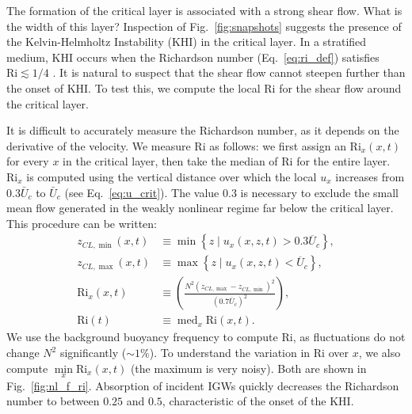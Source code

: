 \documentclass[
        fleqn,
        usenatbib,
    ]{mnras}
\newcommand*{\p}[1]{\left(#1\right)}
\newcommand*{\z}[1]{\left\{#1\right\}}
\DeclareMathOperator*{\med}{med}
\begin{document}
The formation of the critical layer is associated with a strong shear flow. What
is the width of this layer? Inspection of Fig.~\ref{fig:snapshots} suggests the
\textcolor{Corr}{presence} of the Kelvin-Helmholtz Instability (KHI) in the
critical layer. In a stratified medium, KHI occurs when the Richardson number
(Eq.~\eqref{eq:ri_def}) satisfies $\mathrm{Ri} \lesssim 1/4$
\citep[e.g.][]{shu1991physics}. It is natural to suspect that the shear flow
cannot steepen further than the onset of KHI\@. To test this, we compute the
local $\mathrm{Ri}$ for the shear flow around the critical layer.

It is difficult to accurately measure the Richardson number, as it depends on
the derivative of the velocity. We measure $\mathrm{Ri}$ as follows: we first
assign an $\mathrm{Ri}_x(x, t)$ for every $x$ in the critical layer, then take
the median of $\mathrm{Ri}$ for the entire layer. $\mathrm{Ri}_x$ is computed
using the vertical distance over which the local $u_x$ increases from
$0.3\bar{U}_c$ to $\bar{U}_c$ (see Eq.~\eqref{eq:u_crit}). The value $0.3$ is
necessary to exclude the small mean flow generated in the weakly nonlinear
regime far below the
critical layer. This procedure can be written:
\begin{align}
    z_{CL, \min}(x, t) &\equiv \min
        \z{z\mid u_x(x, z, t) > 0.3\overline{U}_c},\\
    z_{CL, \max}(x, t) &\equiv \max
        \z{z\mid u_x(x, z, t) < \overline{U}_c},\\
    \mathrm{Ri}_x(x, t) &\equiv
        \p{\frac{N^2 \p{z_{CL, \max} - z_{CL, \min}}^2}{(0.7
            \overline{U}_c)^2}},\\
    \mathrm{Ri}(t) &\equiv \med_x\mathrm{Ri}\p{x, t}.\label{eq:ri_med_def}
\end{align}
We use the background buoyancy frequency to compute $\mathrm{Ri}$, as
fluctuations do not change $N^2$ significantly ($\sim 1\%$). To understand the
variation in $\mathrm{Ri}$ over $x$, we also compute $\min\limits_x
\mathrm{Ri}_x(x, t)$ (the maximum is very noisy). Both are shown in
Fig.~\ref{fig:nl_f_ri}. \textcolor{Corr}{Absorption} of incident IGWs quickly
decreases the Richardson number to between $0.25$ and $0.5$, characteristic of
the onset of the KHI\@.
\end{document}
